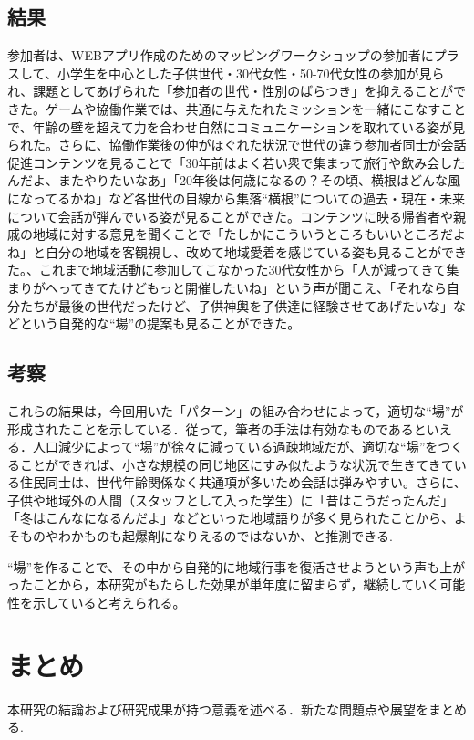 \documentclass[a4paper]{jsarticle}
\begin{document}
\subsection{結果}
参加者は、WEBアプリ作成のためのマッピングワークショップの参加者にプラスして、小学生を中心とした子供世代・30代女性・50-70代女性の参加が見られ、課題としてあげられた「参加者の世代・性別のばらつき」を抑えることができた。ゲームや協働作業では、共通に与えたれたミッションを一緒にこなすことで、年齢の壁を超えて力を合わせ自然にコミュニケーションを取れている姿が見られた。さらに、協働作業後の仲がほぐれた状況で世代の違う参加者同士が会話促進コンテンツを見ることで「30年前はよく若い衆で集まって旅行や飲み会したんだよ、またやりたいなあ」「20年後は何歳になるの？その頃、横根はどんな風になってるかね」など各世代の目線から集落“横根”についての過去・現在・未来について会話が弾んでいる姿が見ることができた。コンテンツに映る帰省者や親戚の地域に対する意見を聞くことで「たしかにこういうところもいいところだよね」と自分の地域を客観視し、改めて地域愛着を感じている姿も見ることができた。、これまで地域活動に参加してこなかった30代女性から「人が減ってきて集まりがへってきてたけどもっと開催したいね」という声が聞こえ、「それなら自分たちが最後の世代だったけど、子供神輿を子供達に経験させてあげたいな」などという自発的な“場”の提案も見ることができた。

\subsection{考察}
これらの結果は，今回用いた「パターン」の組み合わせによって，適切な“場”が形成されたことを示している．従って，筆者の手法は有効なものであるといえる．人口減少によって“場”が徐々に減っている過疎地域だが、適切な“場”をつくることができれば、小さな規模の同じ地区にすみ似たような状況で生きてきている住民同士は、世代年齢関係なく共通項が多いため会話は弾みやすい。さらに、子供や地域外の人間（スタッフとして入った学生）に「昔はこうだったんだ」「冬はこんなになるんだよ」などといった地域語りが多く見られたことから、よそものやわかものも起爆剤になりえるのではないか、と推測できる.\par“場”を作ることで、その中から自発的に地域行事を復活させようという声も上がったことから，本研究がもたらした効果が単年度に留まらず，継続していく可能性を示していると考えられる。
\newpage
\section{まとめ}
本研究の結論および研究成果が持つ意義を述べる．新たな問題点や展望をまとめる.
\end{document}
